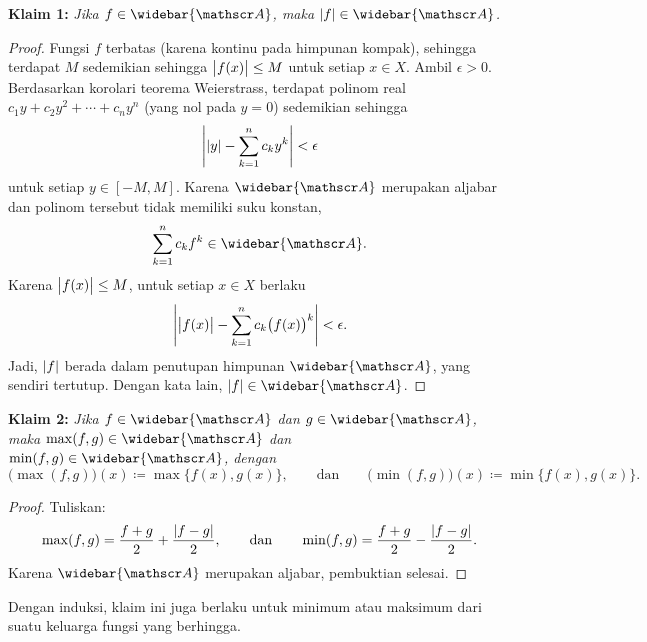 \noindent
\textbf{Klaim 1:} \emph{Jika $f \in \widebar{\sA}$, maka $\sabs{f} \in
\widebar{\sA}$.}

\begin{proof}
Fungsi $f$ terbatas (karena kontinu pada himpunan kompak), sehingga terdapat
$M$ sedemikian sehingga $\bigl\lvert {f(x)} \bigr\rvert \leq M$ untuk setiap $x \in X$.
Ambil $\epsilon > 0$. Berdasarkan korolari teorema Weierstrass, terdapat
polinom real $c_1 y + c_2 y^2 + \cdots+ c_n y^n$ (yang nol pada $y=0$)
sedemikian sehingga
\begin{equation*}
\left\lvert {\lvert {y} \rvert - \sum_{k=1}^n c_k y^k} \right\rvert < \epsilon
\end{equation*}
untuk setiap $y \in [-M,M]$. Karena $\widebar{\sA}$ merupakan aljabar dan
polinom tersebut tidak memiliki suku konstan,
\begin{equation*}
\sum_{k=1}^n c_k f^k \in \widebar{\sA} .
\end{equation*}
Karena $\bigl\lvert {f(x)} \bigr\rvert \leq M$, untuk setiap $x \in X$ berlaku
\begin{equation*}
\left\lvert {\bigl\lvert {f(x)} \bigr\rvert - \sum_{k=1}^n c_k {\bigl(f(x)\bigr)}^k} \right\rvert
< \epsilon .
\end{equation*}
Jadi, $\lvert {f} \rvert$ berada dalam penutupan himpunan $\widebar{\sA}$, yang sendiri tertutup.
Dengan kata lain, $\sabs{f} \in \widebar{\sA}$.
\end{proof}

\medskip

\noindent
\textbf{Klaim 2:} \emph{Jika $f \in \widebar{\sA}$ dan $g \in \widebar{\sA}$, maka
$\max(f,g) \in \widebar{\sA}$ dan
$\min(f,g) \in \widebar{\sA}$, dengan
}
\begin{equation*}
\bigl(\max(f,g)\bigr) (x) \coloneqq \max \bigl\{ f(x), g(x) \bigr\} , \qquad
\text{dan} \qquad
\bigl(\min(f,g)\bigr) (x) \coloneqq \min \bigl\{ f(x), g(x) \bigr\} .
\end{equation*}

\begin{proof}
Tuliskan:
\begin{equation*}
\max(f,g) = \frac{f+g}{2} + \frac{\lvert {f-g} \rvert}{2} ,
\qquad\text{dan}\qquad
\min(f,g) = \frac{f+g}{2} - \frac{\lvert {f-g} \rvert}{2} .
\end{equation*}
Karena $\widebar{\sA}$ merupakan aljabar, pembuktian selesai.
\end{proof}

Dengan induksi, klaim ini juga berlaku untuk minimum atau maksimum dari suatu
keluarga fungsi yang berhingga.

\medskip

